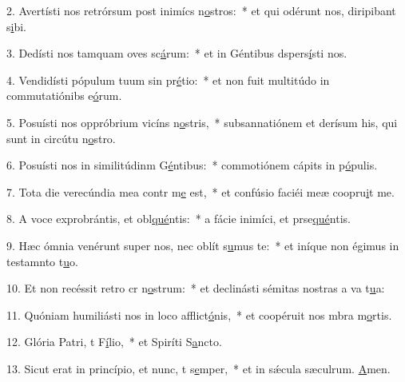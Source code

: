 2. Avertísti nos retrórsum post inimícs n\uline{o}stros:~* et qui odérunt nos, diripibant s\uline{i}bi.\par 
3. Dedísti nos tamquam oves sc\uline{á}rum:~* et in Géntibus dspers\uline{í}sti nos.\par 
4. Vendidísti pópulum tuum sin pr\uline{é}tio:~* et non fuit multitúdo in commutatiónibs e\uline{ó}rum.\par 
5. Posuísti nos oppróbrium vicíns n\uline{o}stris,~* subsannatiónem et derísum his, qui sunt in circútu n\uline{o}stro.\par 
6. Posuísti nos in similitúdinm G\uline{é}ntibus:~* commotiónem cápits in p\uline{ó}pulis.\par 
7. Tota die verecúndia mea contr m\uline{e} est,~* et confúsio faciéi meæ coopru\uline{i}t me.\par 
8. A voce exprobrántis, et obl\uline{qué}ntis:~* a fácie inimíci, et prse\uline{qué}ntis.\par 
9. Hæc ómnia venérunt super nos, nec oblít s\uline{u}mus te:~* et iníque non égimus in testamnto t\uline{u}o.\par 
10. Et non recéssit retro cr n\uline{o}strum:~* et declinásti sémitas nostras a va t\uline{u}a:\par 
11. Quóniam humiliásti nos in loco afflict\uline{ó}nis,~* et coopéruit nos mbra m\uline{o}rtis.\par 
12. Glória Patri, t F\uline{í}lio,~* et Spiríti S\uline{a}ncto.\par 
13. Sicut erat in princípio, et nunc, t s\uline{e}mper,~* et in sǽcula sæculrum. \uline{A}men.\par 
